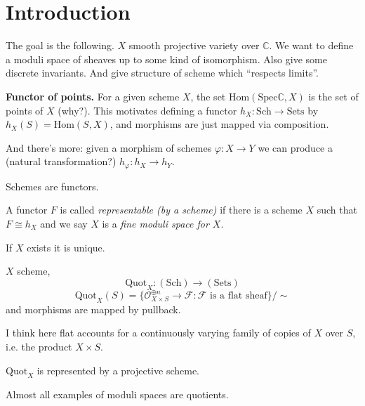 \section{Introduction}
\label{section-introduction}

The goal is the following. $X$ smooth projective variety over $\mathbb{C}$. We
want to define a moduli space of sheaves up to some kind of isomorphism. Also
give some discrete invariants. And give structure of scheme which ``respects
limits''.

{\bf Functor of points.} For a given scheme $X$, the set
$\text{Hom}(\text{Spec}\mathbb{C},X)$ is the set of points of $X$ (why?). This motivates
defining a functor $h_X:\text{Sch}\to \text{Sets}$ by $h_X(S)=\text{Hom}(S,X)$,
and morphisms are just mapped via composition.

And there's more: given a morphism of schemes $\varphi:X\to Y$ we can produce a
(natural transformation?) $h_\varphi:h_X \to h_Y$.

\begin{slogan}
Schemes are functors.
\end{slogan}

\begin{definition}
\label{definition-representable-functor-by-scheme}
A functor $F$ is called {\it representable (by a scheme)} if there is a scheme
$X$ such that $F\cong h_X$ and we say $X$ is a {\it fine moduli space for $X$}.
\end{definition}

\begin{remark}
\label{remark-uniqueness-of-representable-functor}
If $X$ exists it is unique.
\end{remark}

\begin{example}
\label{example-quotient-sheaf}
$X$ scheme,
$$
\text{Quot}_X:(\text{Sch})\to (\text{Sets})
$$
$$
\text{Quot}_X(S)=\{
\mathcal{O}_{X \times S}^{\oplus n}\to\mathcal{F}
:\mathcal{F} \text{ is a flat sheaf}\}\Big/ \sim
$$
and morphisms are mapped by pullback.
\end{example}

I think here flat accounts for a continuously varying family of copies of $X$
over $S$, i.e. the product $X \times S$.

\begin{theorem}
\label{theorem-Quot-is-represented}
$\text{Quot}_X$ is represented by a projective scheme.
\end{theorem}

Almost all examples of moduli spaces are quotients.

